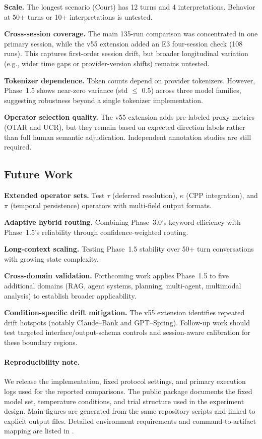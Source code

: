 \documentclass[11pt,a4paper]{article}
\begin{document}
\textbf{Scale.} The longest scenario (Court) has 12 turns and 4 interpretations.
Behavior at 50+ turns or 10+ interpretations is untested.

\textbf{Cross-session coverage.} The main 135-run comparison was concentrated in
one primary session, while the v55 extension added an E3 four-session check
(108 runs). This captures first-order session drift, but broader longitudinal
variation (e.g., wider time gaps or provider-version shifts) remains untested.

\textbf{Tokenizer dependence.} Token counts depend on provider tokenizers.
However, Phase~1.5 shows near-zero variance (std $\leq$ 0.5) across three model
families, suggesting robustness beyond a single tokenizer implementation.

\textbf{Operator selection quality.} The v55 extension adds pre-labeled
proxy metrics (OTAR and UCR), but they remain based on expected direction
labels rather than full human semantic adjudication. Independent annotation
studies are still required.

\subsection{Future Work}

\textbf{Extended operator sets.} Test $\tau$ (deferred resolution),
$\kappa$ (CPP integration), and $\pi$ (temporal persistence) operators
\cite{saito2026phi} with multi-field output formats.

\textbf{Adaptive hybrid routing.} Combining Phase~3.0's keyword efficiency with
Phase~1.5's reliability through confidence-weighted routing.

\textbf{Long-context scaling.} Testing Phase~1.5 stability over 50+ turn
conversations with growing state complexity.

\textbf{Cross-domain validation.} Forthcoming work applies Phase~1.5
to five additional domains (RAG, agent systems, planning, multi-agent,
multimodal analysis) to establish broader applicability.

\textbf{Condition-specific drift mitigation.} The v55 extension identifies
repeated drift hotspots (notably Claude--Bank and GPT--Spring). Follow-up
work should test targeted interface/output-schema controls and session-aware calibration
for these boundary regions.

\paragraph{Reproducibility note.}
We release the implementation, fixed protocol settings, and primary execution logs used for the reported comparisons.
The public package documents the fixed model set, temperature conditions, and trial structure used in the experiment design.
Main figures are generated from the same repository scripts and linked to explicit output files.
Detailed environment requirements and command-to-artifact mapping are listed in
.
\end{document}
